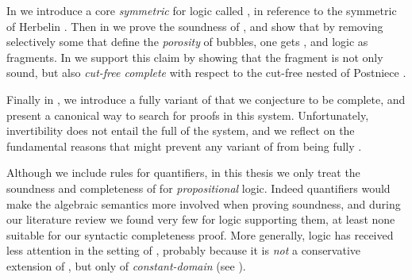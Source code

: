 \begin{scope}
In  we introduce a core \emph{symmetric } for  logic called , in reference to the
symmetric  of Herbelin . Then
in  we prove the soundness of , and show
that by removing selectively some  that define the
\emph{porosity} of  bubbles, one gets ,
 and  logic as fragments. In
 we support this claim by showing that the
 fragment is not only sound, but also \emph{cut-free
complete} with respect to the cut-free nested 
 of Postniece .

Finally in , we introduce a fully 
variant of  that we conjecture to be complete, and present a
canonical way to search for proofs in this system. Unfortunately, invertibility
does not entail the full  of the system, and we reflect on the
fundamental reasons that might prevent any variant of  from being
fully .


\begin{kaonote}
  Although we include rules for quantifiers, in this thesis we only treat the
soundness and completeness of  for \emph{propositional}
logic. Indeed quantifiers would make the algebraic semantics more involved when
proving soundness, and during our literature review we found very few  for  logic supporting them, at least none
suitable for our syntactic completeness proof. More generally,
 logic has received less attention in the setting of
, probably because it is \emph{not} a conservative extension of
 , but only of \emph{constant-domain}
  (see
\cite{crolard_subtractive_2001,aschieri_natural_2018}).
\end{kaonote}


\end{scope}
